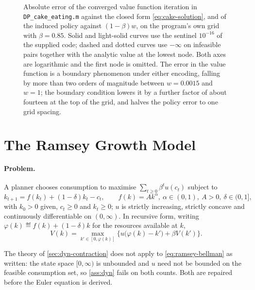 \begin{figure}[htbp]
	\centering
	
	\caption[Discretisation error of the cake-eating value function iteration]{%
		Absolute error of the converged value function iteration in
		\texttt{DP\_cake\_eating.m} against the closed form
		\eqref{eq:cake-solution}, and of the induced policy against
		$(1-\beta)w$, on the program's own grid with $\beta=0.85$. Solid and
		light-solid curves use the sentinel $10^{-16}$ of the supplied code;
		dashed and dotted curves use $-\infty$ on infeasible pairs together with
		the analytic value at the lowest node. Both axes are logarithmic and the
		first node is omitted. The error in the value function is a boundary
		phenomenon under either encoding, falling by more than two orders of
		magnitude between $w=0.0015$ and $w=1$; the boundary condition lowers it
		by a further factor of about fourteen at the top of the grid, and halves
		the policy error to one grid spacing.}
	\label{fig:vfi-error}
\end{figure}


\section{The Ramsey Growth Model}\label{sec:dyn-ramsey}

\paragraph{Problem.} A planner chooses consumption to maximise
$\sum_{t\geq0}\beta^{t}u(c_t)$ subject to
\begin{equation}\label{eq:ramsey-constraint}
	k_{t+1}=f(k_t)+(1-\delta)k_t-c_t,
	\qquad f(k)=Ak^{\alpha},\ \alpha\in(0,1),\ A>0,\ \delta\in(0,1],
\end{equation}
with $k_0>0$ given, $c_t\geq0$ and $k_t\geq0$; $u$ is strictly increasing,
strictly concave and continuously differentiable on $(0,\infty)$. In recursive
form, writing $\varphi(k)\eqdef f(k)+(1-\delta)k$ for the resources available at
$k$,
\begin{equation}\label{eq:ramsey-bellman}
	V(k)=\max_{k'\in[0,\varphi(k)]}
	\bigl\{u\bigl(\varphi(k)-k'\bigr)+\beta V(k')\bigr\}.
\end{equation}

The theory of \autoref{sec:dyn-contraction} does not apply to
\eqref{eq:ramsey-bellman} as written: the state space $[0,\infty)$ is unbounded
and $u$ need not be bounded on the feasible consumption set, so
\autoref{ass:dyn} fails on both counts. Both are repaired before the Euler
equation is derived.

